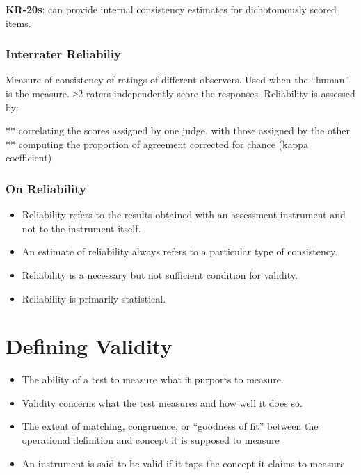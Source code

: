 \documentclass[
  english,
]{book}
\providecommand{\tightlist}{%
  \setlength{\itemsep}{0pt}\setlength{\parskip}{0pt}}
\begin{document}
\textbf{KR-20s}: can provide internal consistency estimates for dichotomously scored items.

\hypertarget{interrater-reliabiliy}{%
\subsubsection{Interrater Reliabiliy}\label{interrater-reliabiliy}}

Measure of consistency of ratings of different observers. Used when the ``human'' is the measure.
≥2 raters independently score the responses. Reliability is assessed by:

** correlating the scores assigned by one judge, with those assigned by the other
** computing the proportion of agreement corrected for chance (kappa coefficient)

\hypertarget{on-reliability}{%
\subsubsection{On Reliability}\label{on-reliability}}

\begin{itemize}
\tightlist
\item
  Reliability refers to the results obtained with an assessment instrument and not to the instrument itself.
\item
  An estimate of reliability always refers to a particular type of consistency.
\item
  Reliability is a necessary but not sufficient condition for validity.
\item
  Reliability is primarily statistical.
\end{itemize}

\hypertarget{defining-validity}{%
\section{Defining Validity}\label{defining-validity}}

\begin{itemize}
\tightlist
\item
  The ability of a test to measure what it purports to measure.
\item
  Validity concerns what the test measures and how well it does so.
\item
  The extent of matching, congruence, or ``goodness of fit'' between the operational definition and concept it is supposed to measure
\item
  An instrument is said to be valid if it taps the concept it claims to measure
\end{itemize}
\end{document}
